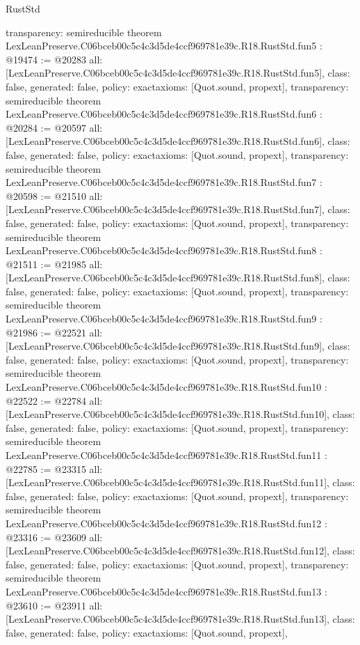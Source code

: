 \begin{lexlean}{RustStd}
\begin{coremodule}
{  transparency: semireducible
}
theorem LexLeanPreserve.C06bceb00c5c4c3d5de4ccf969781e39c.R18.RustStd.fun5 : @19474 := @20283 {
  all: [LexLeanPreserve.C06bceb00c5c4c3d5de4ccf969781e39c.R18.RustStd.fun5],
  class: false,
  generated: false,
  policy: exact{axioms: [Quot.sound, propext]},
  transparency: semireducible
}
theorem LexLeanPreserve.C06bceb00c5c4c3d5de4ccf969781e39c.R18.RustStd.fun6 : @20284 := @20597 {
  all: [LexLeanPreserve.C06bceb00c5c4c3d5de4ccf969781e39c.R18.RustStd.fun6],
  class: false,
  generated: false,
  policy: exact{axioms: [Quot.sound, propext]},
  transparency: semireducible
}
theorem LexLeanPreserve.C06bceb00c5c4c3d5de4ccf969781e39c.R18.RustStd.fun7 : @20598 := @21510 {
  all: [LexLeanPreserve.C06bceb00c5c4c3d5de4ccf969781e39c.R18.RustStd.fun7],
  class: false,
  generated: false,
  policy: exact{axioms: [Quot.sound, propext]},
  transparency: semireducible
}
theorem LexLeanPreserve.C06bceb00c5c4c3d5de4ccf969781e39c.R18.RustStd.fun8 : @21511 := @21985 {
  all: [LexLeanPreserve.C06bceb00c5c4c3d5de4ccf969781e39c.R18.RustStd.fun8],
  class: false,
  generated: false,
  policy: exact{axioms: [Quot.sound, propext]},
  transparency: semireducible
}
theorem LexLeanPreserve.C06bceb00c5c4c3d5de4ccf969781e39c.R18.RustStd.fun9 : @21986 := @22521 {
  all: [LexLeanPreserve.C06bceb00c5c4c3d5de4ccf969781e39c.R18.RustStd.fun9],
  class: false,
  generated: false,
  policy: exact{axioms: [Quot.sound, propext]},
  transparency: semireducible
}
theorem LexLeanPreserve.C06bceb00c5c4c3d5de4ccf969781e39c.R18.RustStd.fun10 : @22522 := @22784 {
  all: [LexLeanPreserve.C06bceb00c5c4c3d5de4ccf969781e39c.R18.RustStd.fun10],
  class: false,
  generated: false,
  policy: exact{axioms: [Quot.sound, propext]},
  transparency: semireducible
}
theorem LexLeanPreserve.C06bceb00c5c4c3d5de4ccf969781e39c.R18.RustStd.fun11 : @22785 := @23315 {
  all: [LexLeanPreserve.C06bceb00c5c4c3d5de4ccf969781e39c.R18.RustStd.fun11],
  class: false,
  generated: false,
  policy: exact{axioms: [Quot.sound, propext]},
  transparency: semireducible
}
theorem LexLeanPreserve.C06bceb00c5c4c3d5de4ccf969781e39c.R18.RustStd.fun12 : @23316 := @23609 {
  all: [LexLeanPreserve.C06bceb00c5c4c3d5de4ccf969781e39c.R18.RustStd.fun12],
  class: false,
  generated: false,
  policy: exact{axioms: [Quot.sound, propext]},
  transparency: semireducible
}
theorem LexLeanPreserve.C06bceb00c5c4c3d5de4ccf969781e39c.R18.RustStd.fun13 : @23610 := @23911 {
  all: [LexLeanPreserve.C06bceb00c5c4c3d5de4ccf969781e39c.R18.RustStd.fun13],
  class: false,
  generated: false,
  policy: exact{axioms: [Quot.sound, propext]},
}
\end{coremodule}
\end{lexlean}
